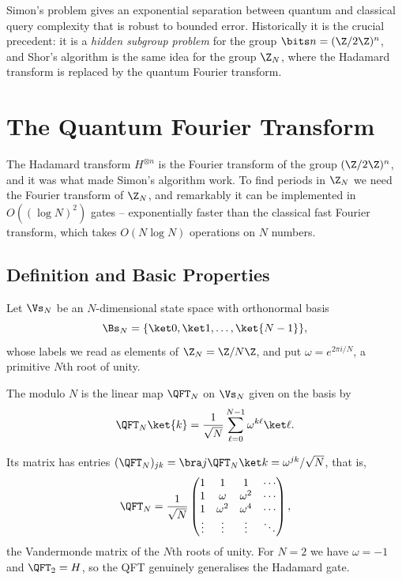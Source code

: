 Simon's problem gives an exponential separation between quantum and classical query complexity that is robust to bounded error. Historically it is the crucial precedent: it is a \emph{hidden subgroup problem} for the group $\bits n = (\Z/2\Z)^n$, and Shor's algorithm is the same idea for the group $\Z_N$, where the Hadamard transform is replaced by the quantum Fourier transform.

\section{The Quantum Fourier Transform}

The Hadamard transform $H^{\otimes n}$ is the Fourier transform of the group $(\Z/2\Z)^n$, and it was what made Simon's algorithm work. To find periods in $\Z_N$ we need the Fourier transform of $\Z_N$, and remarkably it can be implemented in $O((\log N)^2)$ gates -- exponentially faster than the classical fast Fourier transform, which takes $O(N\log N)$ operations on $N$ numbers.

\subsection{Definition and Basic Properties}

Let $\Vs_N$ be an $N$-dimensional state space with orthonormal basis
$$\Bs_N = \{\ket0,\ket1,\dots,\ket{N-1}\},$$
whose labels we read as elements of $\Z_N = \Z/N\Z$, and put $\omega = e^{2\pi i/N}$, a primitive $N$th root of unity.

\begin{definition}
	The  modulo $N$ is the linear map $\QFT_N$ on $\Vs_N$ given on the basis by
	$$\QFT_N\ket{k} = \frac1{\sqrt N}\sum_{\ell = 0}^{N-1}\omega^{k\ell}\ket\ell.$$
\end{definition}

Its matrix has entries $(\QFT_N)_{jk} = \bra j\QFT_N\ket k = \omega^{jk}/\sqrt N$, that is,
$$\QFT_N = \frac1{\sqrt N}\begin{pmatrix} 1 & 1 & 1 & \cdots \\ 1 & \omega & \omega^2&\cdots\\ 1&\omega^2&\omega^4&\cdots\\ \vdots&\vdots&\vdots&\ddots\end{pmatrix},$$
the Vandermonde matrix of the $N$th roots of unity. For $N = 2$ we have $\omega = -1$ and $\QFT_2 = H$, so the QFT genuinely generalises the Hadamard gate.

